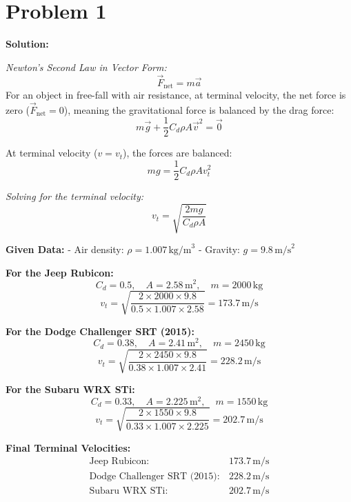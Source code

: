 \section{Problem 1}

\textbf{Solution:}

\textit{Newton's Second Law in Vector Form:}
\[
\vec{F}_{\text{net}} = m\vec{a}
\]
For an object in free-fall with air resistance, at terminal velocity, the net force is zero (\(\vec{F}_{\text{net}} = 0\)), meaning the gravitational force is balanced by the drag force:
\[
m\vec{g} + \frac{1}{2} C_d \rho A \vec{v}^2 = \vec{0}
\]

At terminal velocity (\( v = v_t \)), the forces are balanced:
\[
mg = \frac{1}{2} C_d \rho A v_t^2
\]

\textit{Solving for the terminal velocity:}
\[
v_t = \sqrt{\frac{2mg}{C_d \rho A}}
\]

\textbf{Given Data:}
- Air density: \( \rho = 1.007 \, \text{kg/m}^3 \)
- Gravity: \( g = 9.8 \, \text{m/s}^2 \)

\textbf{For the Jeep Rubicon:}
\[
C_d = 0.5, \quad A = 2.58 \, \text{m}^2, \quad m = 2000 \, \text{kg}
\]
\[
v_t = \sqrt{\frac{2 \times 2000 \times 9.8}{0.5 \times 1.007 \times 2.58}} = 173.7 \, \text{m/s}
\]

\textbf{For the Dodge Challenger SRT (2015):}
\[
C_d = 0.38, \quad A = 2.41 \, \text{m}^2, \quad m = 2450 \, \text{kg}
\]
\[
v_t = \sqrt{\frac{2 \times 2450 \times 9.8}{0.38 \times 1.007 \times 2.41}} = 228.2 \, \text{m/s}
\]

\textbf{For the Subaru WRX STi:}
\[
C_d = 0.33, \quad A = 2.225 \, \text{m}^2, \quad m = 1550 \, \text{kg}
\]
\[
v_t = \sqrt{\frac{2 \times 1550 \times 9.8}{0.33 \times 1.007 \times 2.225}} = 202.7 \, \text{m/s}
\]

\textbf{Final Terminal Velocities:}
\begin{align*}
\text{Jeep Rubicon}: & \, 173.7 \, \text{m/s} \\
\text{Dodge Challenger SRT (2015)}: & \, 228.2 \, \text{m/s} \\
\text{Subaru WRX STi}: & \, 202.7 \, \text{m/s}
\end{align*}